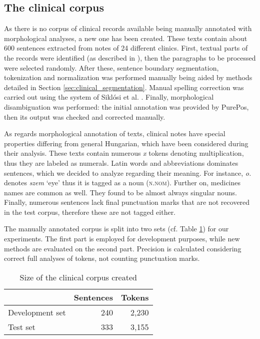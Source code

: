 \subsection{The clinical corpus}



As there is no corpus of clinical records available being manually annotated with morphological analyses, a new one has been created. 
These texts contain about 600 sentences extracted from notes of 24 different clinics. 
First, textual parts of the records were identified (as described in \cite{Siklosi2012}), then the paragraphs to be processed were selected randomly. 
After these, sentence boundary segmentation, tokenization and normalization was performed manually being aided by methods detailed in Section \ref{sec:clinical_segmentation}. 
Manual spelling correction was carried out using the system of Siklósi et al. \cite{Siklosi2013}. 
Finally, morphological disambiguation was performed: the initial annotation was provided by PurePos, then its output was checked and corrected manually. 

As regards morphological annotation of texts, clinical notes have special properties differing from general Hungarian, which have been considered during their analysis. 
These texts contain numerous \textit{x} tokens denoting multiplication, thus they are labeled as numerals. 
Latin words and abbreviations dominates sentences, which we decided to analyze regarding their meaning. 
For instance, \textit{o.} denotes \textit{szem} `eye’ thus it is tagged as a noun (\textsc{n.nom}). 
Further on, medicines names are common as well. 
They found to be almost always singular nouns. 
Finally, numerous sentences lack final punctuation marks that are not recovered in the test corpus, therefore these are not tagged either. 

The manually annotated corpus is split into two sets (cf. Table \ref{tab:clin_corpus}) for our experiments. 
The first part is employed for development purposes, while new methods are evaluated on the second part.
Precision is calculated considering correct full analyses of tokens, not counting punctuation marks.

\begin{table}[H]
\centering
\caption{Size of the clinical corpus created}
\label{tab:clin_corpus}
\begin{tabular}{ l  r  r } 
\hline
& Sentences & Tokens \\
\hline
Development set & 240 & 2,230 \\
Test set & 333 & 3,155 \\
\hline
\end{tabular}
\end{table}


